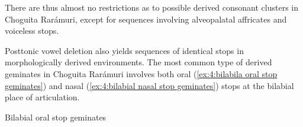 There are thus almost no restrictions as to possible derived consonant clusters in Choguita Rarámuri, except for sequences involving alveopalatal affricates and voiceless stops.

Posttonic vowel deletion also yields sequences of identical stops in morphologically derived environments. The most common type of derived geminates in Choguita Rarámuri involves both oral (\ref{ex:4:bilabila oral stop geminates}) and nasal (\ref{ex:4:bilabial nasal stop geminates}) stops at the bilabial place of articulation.

\ea\label{ex:4:bilabila oral stop geminates}
{Bilabial oral stop geminates}

\pagebreak
    \z
\z

